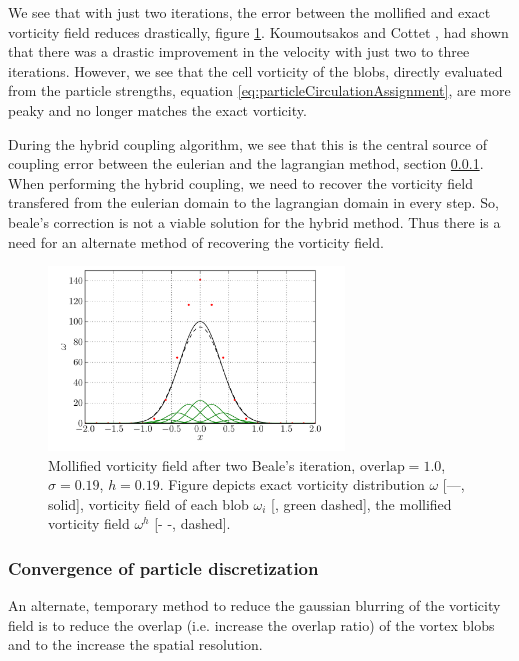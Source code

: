 We see that with just two iterations, the error between the mollified and exact vorticity field reduces drastically, figure \ref{fig:bealesCorrection}. Koumoutsakos and Cottet \cite{Cottet2000a}, had shown that there was a drastic improvement in the velocity with just two to three iterations. However, we see that the cell vorticity of the blobs, directly evaluated from the particle strengths, equation \ref{eq:particleCirculationAssignment}, are more peaky and no longer matches the exact vorticity. 

During the hybrid coupling algorithm, we see that this is the central source of coupling error between the eulerian and the lagrangian method, section \ref{}. When performing the hybrid coupling, we need to recover the vorticity field transfered from the eulerian domain to the lagrangian domain in every step. So, beale's correction is not a viable solution for the hybrid method. Thus there is a need for an alternate method of recovering the vorticity field.


	\begin{figure}[t]
	\centering
	\includegraphics[width=0.7\textwidth]{figures/lagrangian/bealesCorrection.pdf}
	\caption{Mollified vorticity field after two Beale's iteration, $\mathrm{overlap}=1.0$, $\sigma=0.19$, $h=0.19$. Figure depicts exact vorticity distribution $\omega$ [---, solid], vorticity field of each blob $\omega_i$ [{\color{plotGreen}{---}}, green dashed], the mollified vorticity field $\omega^h$ [- -, dashed].  }
	\label{fig:bealesCorrection}
	\end{figure}



\subsubsection{Convergence of particle discretization}

An alternate, temporary method to reduce the gaussian blurring of the vorticity field is to reduce the overlap (i.e. increase the overlap ratio) of the vortex blobs and to the increase the spatial resolution.
	
